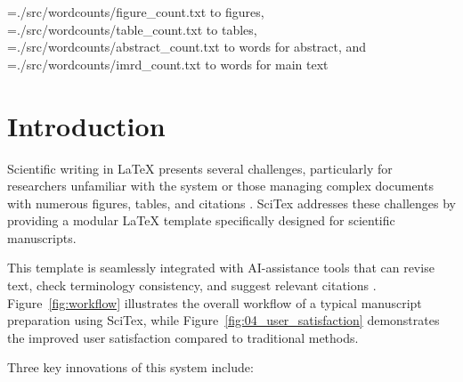 \documentclass[preprint,review,12pt]{elsarticle}%
\newcommand\readwordcount[1]{%
  \openin\wordcount=#1
  \read\wordcount to \thewordcount
  \closein\wordcount
  \thewordcount
}
\begin{document}
\begin{frontmatter}

\begin{wordcount}
\readwordcount{./src/wordcounts/figure_count.txt} figures, \readwordcount{./src/wordcounts/table_count.txt} tables, \readwordcount{./src/wordcounts/abstract_count.txt} words for abstract, and \readwordcount{./src/wordcounts/imrd_count.txt} words for main text
\end{wordcount}



\section{Introduction}
\label{sec:introduction}

Scientific writing in LaTeX presents several challenges, particularly for researchers unfamiliar with the system or those managing complex documents with numerous figures, tables, and citations \cite{Smith2020}. SciTex addresses these challenges by providing a modular LaTeX template specifically designed for scientific manuscripts. 

This template is seamlessly integrated with AI-assistance tools that can revise text, check terminology consistency, and suggest relevant citations \cite{Johnson2023}. Figure~\ref{fig:workflow} illustrates the overall workflow of a typical manuscript preparation using SciTex, while Figure~\ref{fig:04_user_satisfaction} demonstrates the improved user satisfaction compared to traditional methods.


Three key innovations of this system include:


\end{frontmatter}
\end{document}
